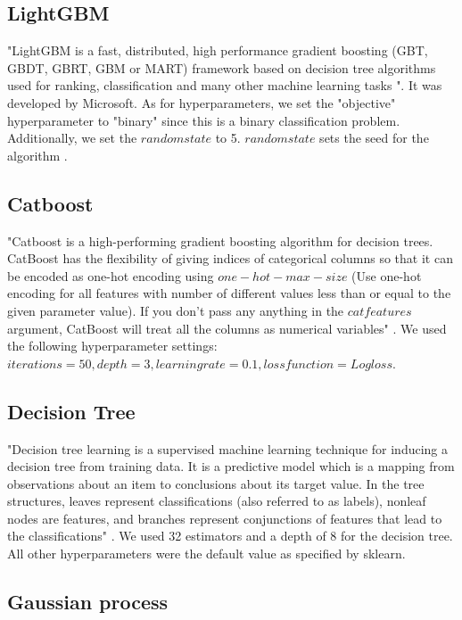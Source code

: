 \documentclass[10pt]{article}
\begin{document}
\subsection{LightGBM}
"LightGBM is a fast, distributed, high performance gradient boosting (GBT, GBDT, GBRT, GBM or MART) framework based on decision tree algorithms used for ranking, classification and many other machine learning tasks \cite{LightGBM_microsoft}". It was developed by Microsoft. As for hyperparameters, we set the "objective" hyperparameter to "binary" since this is a binary classification problem. Additionally, we set the $randomstate$ to 5. $randomstate$ sets the seed for the algorithm \cite{light_gbm_parameters}.


\subsection{Catboost}
"Catboost is a high-performing gradient boosting algorithm for decision trees. CatBoost has the flexibility of giving indices of categorical columns so that it can be encoded as one-hot encoding using $one-hot-max-size$ (Use one-hot encoding for all features with number of different values less than or equal to the given parameter value).
If you don’t pass any anything in the $catfeatures$ argument, CatBoost will treat all the columns as numerical variables" \cite{advantages_boosting_algos}. We used the following hyperparameter settings: $iterations=50, depth=3, learningrate=0.1, lossfunction=Logloss$.




\subsection{Decision Tree}
"Decision tree learning is a supervised machine learning technique for inducing a decision tree from training data. It is a predictive model which is a mapping from observations about an item to conclusions about its target value. In the tree structures, leaves represent classifications (also referred to as labels), nonleaf nodes are features, and branches represent conjunctions of features that lead to the classifications" \cite{decision_tree}.
We used 32 estimators and a depth of 8 for the decision tree. All other hyperparameters were the default value as specified by sklearn.




\subsection{Gaussian process}
\end{document}
